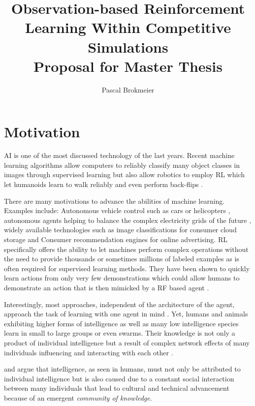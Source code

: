 \documentclass[12pt,a4paper]{article}
\title{Observation-based Reinforcement Learning Within Competitive Simulations\\
\small{Proposal for Master Thesis}}
\author{Pascal Brokmeier}
\begin{document}
\maketitle

\section{Motivation}

\ac{AI} is one of the most discussed technology of the last years. Recent machine learning algorithms allow computers to reliably classify many object classes in images \cite{krizhevsky2012imagenet} through supervised learning but also allow robotics to employ \ac{RL} which let humanoids learn to walk reliably and even perform back-flips \cite{proximalpolicyopt}.

There are many motivations to advance the abilities of machine learning. Examples include: Autonomous vehicle control such as cars or helicopters \cite{abbeel2010autonomous}, autonomous agents helping to balance the complex electricity grids of the future \cite{peters2013reinforcement}, widely available technologies such as image classifications for consumer cloud storage and Consumer recommendation engines for online advertising. \ac{RL} specifically offers the ability to let machines perform complex operations without the need to provide thousands or sometimes millions of labeled examples as is often required for supervised learning methods. They have been shown to quickly learn actions from only very few demonstrations which could allow humans to demonstrate an action that is then mimicked by a RF based agent \cite{duan2017one}.

Interestingly, most approaches, independent of the architecture of the agent, approach the task of learning with one agent in mind \cite[p.694ff]{russell2016artificial}. Yet, humans and animals exhibiting higher forms of intelligence as well as many low intelligence species learn in small to large groups or even swarms. Their knowledge is not only a product of individual intelligence but a result of complex network effects of many individuals influencing and interacting with each other \cite[p.200f]{sloman2017knowledge}.

\cite{sloman2017knowledge} and \cite{wegner1995computer} argue that intelligence, as seen in humans, must not only be attributed to individual intelligence but is also caused due to a constant social interaction between many individuals that lead to cultural and technical advancement because of an emergent \emph{community of knowledge}.
\end{document}
